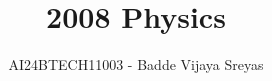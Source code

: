 \documentclass[journal]{IEEEtran}
\begin{document}

\vspace{3cm}

\title{2008 Physics}
\author{AI24BTECH11003 - Badde Vijaya Sreyas}
{\let\newpage\relax\maketitle}

\renewcommand{\thefigure}{\theenumi}
\renewcommand{\thetable}{\theenumi}
\setlength{\intextsep}{10pt} %


\renewcommand{\thetable}{\theenumi}
\end{document}
